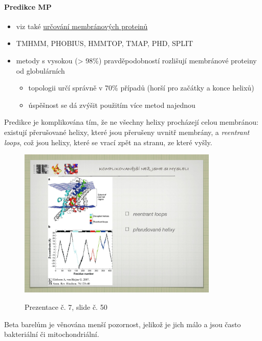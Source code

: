 \documentclass[DIV=8]{scrreprt}
\begin{document}
\paragraph{Predikce MP}
\begin{itemize}[nosep]
    \item viz také \hyperref[Určování membránových proteinů]{určování membránových proteinů}
    \item TMHMM, PHOBIUS, HMMTOP, TMAP, PHD, SPLIT
    \item metody s vysokou (> 98\%) pravděpodobností rozlišují membránové proteiny od globulárních
\begin{itemize}[nosep]
    \item topologii určí správně v 70\% případů (horší pro začátky a konce helixů)
    \item úspěšnost se dá zvýšit použitím více metod najednou
\end{itemize}

\end{itemize}



Predikce je komplikována tím, že ne všechny helixy procházejí celou membránou: existují přerušované helixy, které jsou přerušeny uvnitř membrány, a \emph{reentrant loops}, což jsou helixy, které se vrací zpět na stranu, ze které vyšly. \begin{figure}
    \caption{Prezentace č. 7, slide č. 50}
    \includegraphics[width=0.85\textwidth]{slides-7/slide-50.jpg}
    \centering
    \label{slides-7-slide-50}
\end{figure}


Beta barelům je věnována menší pozornost, jelikož je jich málo a jsou často bakteriální či mitochondriální.
\end{document}
